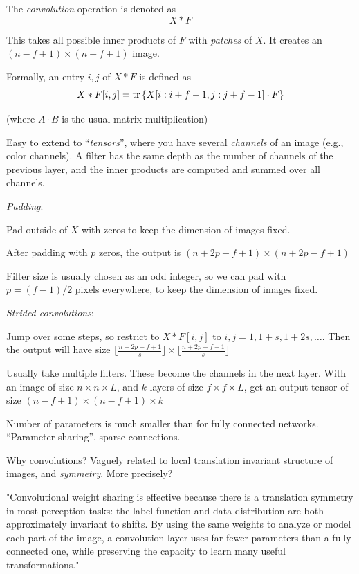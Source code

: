 \documentclass[english]{article}
\begin{document}
The \emph{convolution} operation is denoted as 
$$X * F$$

This takes all possible inner products of $F$ with \emph{patches} of $X$. It creates an $(n-f+1) \times (n-f+1)$ image.

Formally, an entry $i,j$ of $X * F$ is defined as $$X * F[i,j]=\operatorname{tr} \left\{X[i:i+f-1,j:j+f-1] \cdot F \right\}$$ 

(where $A\cdot B$ is the usual matrix multiplication)

Easy to extend to ``\emph{tensors}'', where you have several \emph{channels} of an image (e.g., color channels). A filter has the same depth as the number of channels of the previous layer, and the inner products are computed and summed over all channels.

\item \emph{Padding}: 

Pad outside of $X$ with zeros to keep the dimension of images fixed. 

After padding with $p$ zeros, the output is $(n+2p-f+1) \times (n+2p-f+1)$

Filter size is usually chosen as an odd integer, so we can pad with $p = (f-1)/2$ pixels everywhere, to keep the dimension of images fixed. 

\item \emph{Strided convolutions}:

Jump over some steps, so restrict to $X * F[i,j]$ to $i,j=1,1+s,1+2s,\ldots$.
Then the output will have size $\lfloor \frac{n+2p-f+1}{s}\rfloor \times \lfloor \frac{n+2p-f+1}{s}\rfloor$

\item Usually take multiple filters. These become the channels in the next layer. With an image of size $n \times n \times L$, and $k$ layers of size 
$f \times f \times L$, get  an output tensor of size $(n-f+1) \times (n-f+1) \times k$ 


Number of parameters is much smaller than for fully connected networks. ``Parameter sharing'', sparse connections. %

Why convolutions? Vaguely related to local translation invariant structure of images, and \emph{symmetry}. %
More precisely?

"Convolutional weight sharing is effective because there is a translation symmetry in most perception tasks: the label function and data distribution are both approximately
invariant to shifts.  By using the same weights to analyze
or model each part of the image, a convolution layer uses
far fewer parameters than a fully connected one, while preserving the capacity to learn many useful transformations."
\end{document}
